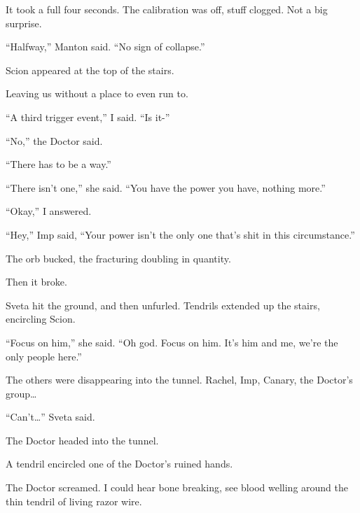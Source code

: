 It took a full four seconds.  The calibration was off, stuff clogged.  Not a big surprise.



``Halfway,'' Manton said.  ``No sign of collapse.''



Scion appeared at the top of the stairs.



Leaving us without a place to even run to.



``A third trigger event,'' I said.  ``Is it-''



``No,'' the Doctor said.



``There has to be a way.''



``There isn't one,'' she said.  ``You have the power you have, nothing more.''



``Okay,'' I answered.



``Hey,'' Imp said, ``Your power isn't the only one that's shit in this circumstance.''



The orb bucked, the fracturing doubling in quantity.



Then it broke.



Sveta hit the ground, and then unfurled.  Tendrils extended up the stairs, encircling Scion.



``Focus on him,'' she said.  ``Oh god.  Focus on him.  It's him and me, we're the only people here.''



The others were disappearing into the tunnel.  Rachel, Imp, Canary, the Doctor's group\ldots



``Can't\ldots'' Sveta said.



The Doctor headed into the tunnel.



A tendril encircled one of the Doctor's ruined hands.



The Doctor screamed.  I could hear bone breaking, see blood welling around the thin tendril of living razor wire.



